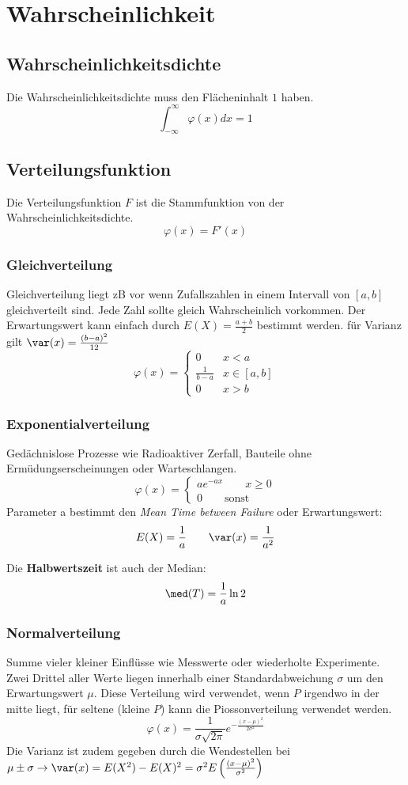 \section{Wahrscheinlichkeit}
\subsection{Wahrscheinlichkeitsdichte}

Die Wahrscheinlichkeitsdichte muss den Flächeninhalt $1$ haben.
\[
\int_{-\infty}^{\infty}\varphi(x)dx = 1
\]

\subsection{Verteilungsfunktion}
Die Verteilungsfunktion $F$ ist die Stammfunktion von der Wahrscheinlichkeitsdichte.
\[
\varphi(x) = F'(x)
\]

\subsubsection{Gleichverteilung}
Gleichverteilung liegt zB vor wenn Zufallszahlen  in einem Intervall von $[a, b]$ gleichverteilt sind. Jede Zahl sollte gleich Wahrscheinlich vorkommen. Der Erwartungswert kann einfach durch $E(X) = \frac{a + b}{2}$ bestimmt werden. für Varianz gilt $\var(x) = \frac{(b-a)^2}{12}$
\[
\varphi(x) = \begin{cases}
	0 & x < a \\
	\frac{1}{b-a} & x \in [a,b] \\
	0 & x > b
\end{cases}
\]

\subsubsection{Exponentialverteilung}
Gedächnislose Prozesse wie Radioaktiver Zerfall, Bauteile ohne Ermüdungserscheinungen oder Warteschlangen.
\[\varphi(x) = \begin{cases*}
	ae^{-ax} \qquad x \geq 0 \\
	0 \qquad \text{sonst}
\end{cases*}\]
Parameter a bestimmt den \textit{Mean Time between Failure} oder Erwartungswert: 
\[E(X) = \frac{1}{a} \qquad \var(x) = \frac{1}{a^2}\]

\noindent Die \textbf{Halbwertszeit} ist auch der Median:
\[ \med(T) = \frac{1}{a}\ln2 \] 

\subsubsection{Normalverteilung}
Summe vieler kleiner Einflüsse wie Messwerte oder wiederholte Experimente. Zwei Drittel aller Werte liegen innerhalb einer Standardabweichung $\sigma$ um den Erwartungswert $\mu$. Diese Verteilung wird verwendet, wenn $P$ irgendwo in der mitte liegt, für seltene (kleine $P$) kann die Piossonverteilung verwendet werden.
\[
\varphi(x) = \frac{1}{\sigma\sqrt{2\pi}}e^{-\frac{(x-\mu)^2}{2\sigma^2}}
\]
\noindent Die Varianz ist zudem gegeben durch die Wendestellen bei $\mu \pm \sigma \rightarrow \var(x) = E(X^2) - E(X)^2 = \sigma^2E\left(\frac{(x - \mu)^2}{\sigma^2}\right)$

